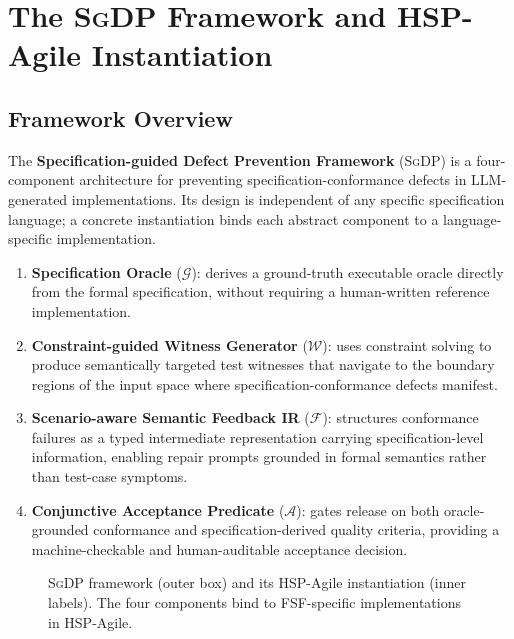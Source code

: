\section{The \textsc{SgDP} Framework and HSP-Agile Instantiation}
\label{sec:method}

\subsection{Framework Overview}
\label{subsec:framework-overview}

The \textbf{Specification-guided Defect Prevention Framework} (\textsc{SgDP}) is a
four-component architecture for preventing specification-conformance defects in
LLM-generated implementations.  Its design is independent of any specific specification
language; a concrete instantiation binds each abstract component to a language-specific
implementation.

\begin{enumerate}
  \item \textbf{Specification Oracle} ($\mathcal{G}$): derives a ground-truth executable
    oracle directly from the formal specification, without requiring a human-written
    reference implementation.

  \item \textbf{Constraint-guided Witness Generator} ($\mathcal{W}$): uses constraint
    solving to produce semantically targeted test witnesses that navigate to the boundary
    regions of the input space where specification-conformance defects manifest.

  \item \textbf{Scenario-aware Semantic Feedback IR} ($\mathcal{F}$): structures
    conformance failures as a typed intermediate representation carrying
    specification-level information, enabling repair prompts grounded in formal semantics
    rather than test-case symptoms.

  \item \textbf{Conjunctive Acceptance Predicate} ($\mathcal{A}$): gates release on both
    oracle-grounded conformance and specification-derived quality criteria,
    providing a machine-checkable and human-auditable acceptance decision.
\end{enumerate}

\begin{figure}[t]
  \centering
  
  \caption{\textsc{SgDP} framework (outer box) and its HSP-Agile instantiation (inner
    labels). The four components bind to FSF-specific implementations in HSP-Agile.}
  \label{fig:architecture}
\end{figure}

